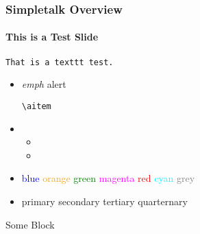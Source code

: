 \documentclass[aspectratio=169]{beamer}
\begin{document}
\begin{frame}
    \frametitle{Simpletalk Overview}
    \framesubtitle{This is a Test Slide}
    \lipsum[1][2-3]
    \texttt{That is a texttt test.}
    \begin{itemize}
        \item {} \emph{emph}    \alert{alert}
        \begin{itemize}
            \aitem \texttt{\textbackslash aitem} \lipsum[1][1]
        \end{itemize}
        \item \lipsum[1][2-4]
        \begin{itemize}
            \item \lipsum[1][2-4]
            \item \lipsum[1][1]
        \end{itemize}
        \item
            \textcolor{blue}{blue}
            \textcolor{orange}{orange}
            \textcolor{green}{green}
            \textcolor{magenta}{magenta}
            \textcolor{red}{red}
            \textcolor{cyan}{cyan}
            \textcolor{grey}{grey}
        \item
            \textcolor{primary}{primary}
            \textcolor{secondary}{secondary}
            \textcolor{tertiary}{tertiary}
            \textcolor{quarternary}{quarternary}
    \end{itemize}
    \begin{block}{Some Block}
       \lipsum[1][1] \faChessKnight
    \end{block}
\end{frame}
\end{document}

